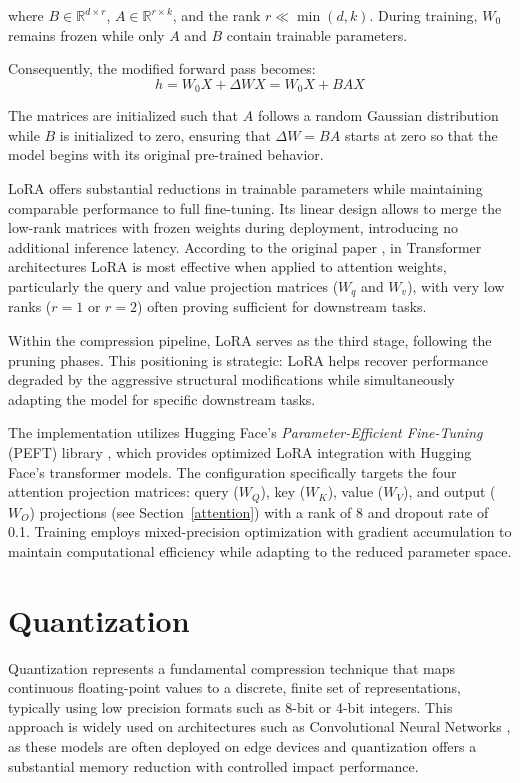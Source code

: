where $B \in \mathbb{R}^{d \times r}$, $A \in \mathbb{R}^{r \times k}$, and the rank $r \ll \min(d,k)$. During training, $W_0$ remains frozen while only $A$ and $B$ contain trainable parameters.

Consequently, the modified forward pass becomes:
\begin{equation}
h = W_0X + \Delta WX = W_0X + BAX
\end{equation}

The matrices are initialized such that $A$ follows a random Gaussian distribution while $B$ is initialized to zero, ensuring that $\Delta W = BA$ starts at zero so that the model begins with its original pre-trained behavior.

LoRA offers substantial reductions in trainable parameters while maintaining comparable performance to full fine-tuning. Its linear design allows to merge the low-rank matrices with frozen weights during deployment, introducing no additional inference latency. According to the original paper \cite{lora}, in Transformer architectures LoRA is most effective when applied to attention weights, particularly the query and value projection matrices ($W_q$ and $W_v$), with very low ranks ($r=1$ or $r=2$) often proving sufficient for downstream tasks.

Within the compression pipeline, LoRA serves as the third stage, following the pruning phases. This positioning is strategic: LoRA helps recover performance degraded by the aggressive structural modifications while simultaneously adapting the model for specific downstream tasks.

The implementation utilizes Hugging Face's \textit{Parameter-Efficient Fine-Tuning} (PEFT) library \cite{peft}, which provides optimized LoRA integration with Hugging Face's transformer models. The configuration specifically targets the four attention projection matrices: query ($W_Q$), key ($W_K$), value ($W_V$), and output ($W_O$) projections (see Section~\ref{attention}) with a rank of 8 and dropout rate of 0.1. Training employs mixed-precision optimization with gradient accumulation to maintain computational efficiency while adapting to the reduced parameter space.

\section{Quantization} \label{quantization}

Quantization represents a fundamental compression technique that maps continuous floating-point values to a discrete, finite set of representations, typically using low precision formats such as 8-bit or 4-bit integers. This approach is widely used on architectures such as Convolutional Neural Networks \cite{quant_cnn}, as these models are often deployed on edge devices and quantization offers a substantial memory reduction with controlled impact performance.

